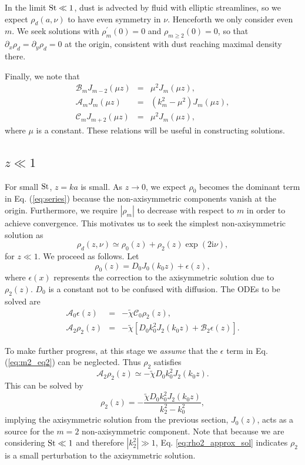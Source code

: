 \documentclass[apj]{emulateapj}
\newcommand{\Eq}[1]{Eq. (\ref{#1})}
\newcommand{\eq}[1]{\Eq{#1}}
\newcommand{\beq}{\begin{equation}}
\newcommand{\eeq}{\end{equation}}
\newcommand{\beqn}{\begin{eqnarray}}
\newcommand{\eeqn}{\end{eqnarray}}
\begin{document}
In the limit $\rm{St}\ll 1$, dust is advected by fluid with elliptic
streamlines, so we expect $\rho_d(a,\nu)$ to have even symmetry in
$\nu$. Henceforth we only consider even $m$. We seek solutions with  
$\rho_m^\prime(0)=0$ and $\rho_{m\geq2}(0)=0$, so that
$\partial_x\rho_d=\partial_y\rho_d=0$ at the origin, consistent with 
dust reaching maximal density there.  

Finally, we note that
\beqn\label{eq:ops2}
\mathcal{B}_mJ_{m-2}(\mu z) &=& \mu^2J_m(\mu z),\\
\mathcal{A}_mJ_m(\mu z) &=& \left(k_m^2 - \mu^2\right)J_m(\mu z),\\
\mathcal{C}_mJ_{m+2}(\mu z) &= & \mu^2J_m(\mu z),
\eeqn
where $\mu$ is a constant. These relations will be useful in
constructing solutions. 

\subsection{$z\ll 1$}
For small $\rm{St}$, $z=ka$ is small. As $z\to 0$, we expect $\rho_0$
becomes the dominant term in \eq{eq:series} because the
non-axisymmetric components vanish at the origin. Furthermore, we
require $|\rho_m|$ to decrease with respect to $m$ in order to achieve
convergence. This motivates us to seek the simplest non-axisymmetric solution as  
\beq
\rho_d(z,\nu) \simeq \rho_0(z) + \rho_2(z)\exp{\left(2\mathrm{i}\nu\right)},  
\eeq
for $z\ll 1$. We proceed as follows. Let
\beq
\rho_0(z) = D_0J_0(k_0z) + \epsilon(z),  
\eeq
where $\epsilon(x)$ represents the correction to the axisymmetric
solution due to $\rho_2(z)$. $D_0$ is a constant not to be confused
with diffusion. The ODEs to be
solved are 
\beqn 
\mathcal{A}_0\epsilon(z) &=& -\tilde{\chi}\mathcal{C}_0\rho_2(z),\label{eq:m2_eq1}\\
\mathcal{A}_2\rho_2(z) &=& -\tilde{\chi}\left[D_0k_0^2J_2(k_0z) +
  \mathcal{B}_2\epsilon(z)\right].\label{eq:m2_eq2} 
\eeqn

To make further progress, at this stage we \emph{assume} that the
$\epsilon$ term in \eq{eq:m2_eq2} can be neglected. Thus $\rho_2$ satisfies
\beq\label{eq:rho2_approx}
\mathcal{A}_2\rho_2(z) \simeq -\tilde{\chi}D_0k_0^2J_2(k_0z).
\eeq
This can be solved by 
\beq\label{eq:rho2_approx_sol}
\rho_2(z)  = -\frac{\tilde{\chi}D_0k_0^2J_2(k_0z)}{k_2^2 - k_0^2}, 
\eeq
implying the axisymmetric solution from the previous section, 
$J_0(z)$, acts as a source for the $m=2$ non-axisymmetric
component. Note that because we are considering $\rm{St}\ll1$ and
therefore $|k_2^2|\gg1$, Eq. \ref{eq:rho2_approx_sol} indicates $\rho_2$
is a small perturbation to the axisymmetric solution.     
\end{document}
